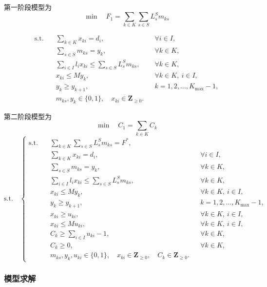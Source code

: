 \documentclass[UTF8]{ctexart}
\begin{document}
第一阶段模型为
\begin{equation}
\min \quad F_1=\sum_{k\in K}\sum_{s\in S}L_s^S m_{ks}
\end{equation}

\begin{equation}
\begin{aligned}
\text{s.t.}\quad
&\sum_{k\in K}x_{ki}=d_i, &&\forall i\in I,\\
&\sum_{s\in S}m_{ks}=y_k, &&\forall k\in K,\\
&\sum_{i\in I}l_i x_{ki}\leq \sum_{s\in S}L_s^S m_{ks}, &&\forall k\in K,\\
&x_{ki}\leq M y_k, &&\forall k\in K,\ i\in I,\\
&y_k\geq y_{k+1}, &&k=1,2,\ldots,K_{\max}-1,\\
&m_{ks},y_k\in\{0,1\},\quad x_{ki}\in \mathbf{Z}_{\ge 0}.
\end{aligned}
\end{equation}

第二阶段模型为
\begin{equation}
\min \quad C_1=\sum_{k\in K}C_k
\end{equation}
\begin{equation}
	\mathrm{s.t.}\quad
	\left\{
\begin{aligned}
\mathrm{s.t.}\quad
&\sum_{k\in K}\sum_{s\in S}L_s^S m_{ks}=F^*,\\
&\sum_{k\in K}x_{ki}=d_i, &&\forall i\in I,\\
&\sum_{s\in S}m_{ks}=y_k, &&\forall k\in K,\\
&\sum_{i\in I}l_i x_{ki}\leq \sum_{s\in S}L_s^S m_{ks}, &&\forall k\in K,\\
&x_{ki}\leq M y_k, &&\forall k\in K,\ i\in I,\\
&y_k\geq y_{k+1}, &&k=1,2,\ldots,K_{\max}-1,\\
&x_{ki}\geq u_{ki}, &&\forall k\in K,\ i\in I,\\
&x_{ki}\leq M u_{ki}, &&\forall k\in K,\ i\in I,\\
&C_k\geq \sum_{i\in I}u_{ki}-1, &&\forall k\in K,\\
&C_k\geq 0, &&\forall k\in K,\\
&m_{ks},y_k,u_{ki}\in\{0,1\},\quad x_{ki}\in \mathbf{Z}_{\ge 0},\quad C_k\in \mathbf{Z}_{\ge 0}.
\end{aligned}
	\right.
\end{equation}


\subsubsection{模型求解}
\end{document}
